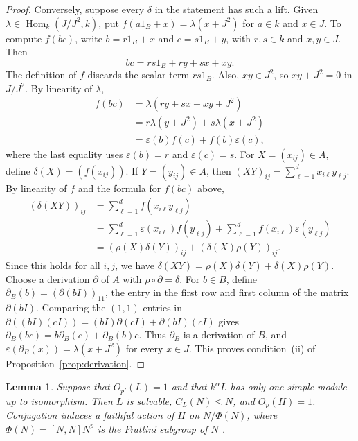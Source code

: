 \documentclass[11pt,a4paper]{article}
\newtheorem{lemma}[theorem]{Lemma}
\theoremstyle{definition}
\theoremstyle{remark}
\numberwithin{equation}{section}
\DeclareMathOperator{\Hom}{Hom}
\begin{document}
\begin{proof}
		Conversely, suppose every $\delta$ in the statement has such a lift.
		Given $\lambda\in\Hom_k(J/J^2,k)$, put $f(a1_B+x)=\lambda(x+J^2)$
		for $a\in k$ and $x\in J$. To compute $f(bc)$, write
		$b=r1_B+x$ and $c=s1_B+y$, with $r,s\in k$ and $x,y\in J$. Then
		\[
		bc=rs1_B+ry+sx+xy.
		\]
		The definition of $f$ discards the scalar term $rs1_B$. Also,
		$xy\in J^2$, so $xy+J^2=0$ in $J/J^2$. By linearity of $\lambda$,
		\[
		\begin{aligned}
			f(bc)&=\lambda(ry+sx+xy+J^2)\\
			&=r\lambda(y+J^2)+s\lambda(x+J^2)\\
			&=\varepsilon(b)f(c)+f(b)\varepsilon(c),
		\end{aligned}
		\]
		where the last equality uses $\varepsilon(b)=r$ and $\varepsilon(c)=s$.
		For $X=(x_{ij})\in A$, define $\delta(X)=(f(x_{ij}))$.
		If $Y=(y_{ij})\in A$, then $(XY)_{ij}=\sum_{\ell=1}^d x_{i\ell}y_{\ell j}$.
		By linearity of $f$ and the formula for $f(bc)$ above,
		\[
		\begin{aligned}
			(\delta(XY))_{ij}
			&=\sum_{\ell=1}^d f(x_{i\ell}y_{\ell j})\\
			&=\sum_{\ell=1}^d \varepsilon(x_{i\ell})f(y_{\ell j})
			+\sum_{\ell=1}^d f(x_{i\ell})\varepsilon(y_{\ell j})\\
			&=(\rho(X)\delta(Y))_{ij}+(\delta(X)\rho(Y))_{ij}.
		\end{aligned}
		\]
		Since this holds for all $i,j$, we have
		$\delta(XY)=\rho(X)\delta(Y)+\delta(X)\rho(Y)$. Choose a derivation $\partial$
		of $A$ with $\rho\circ\partial=\delta$. For $b\in B$, define
		$\partial_B(b)=(\partial(bI))_{11}$, the entry in the first row and first
		column of the matrix $\partial(bI)$. Comparing the $(1,1)$ entries in
		$\partial((bI)(cI))=(bI)\partial(cI)+\partial(bI)(cI)$ gives
		$\partial_B(bc)=b\partial_B(c)+\partial_B(b)c$. Thus $\partial_B$ is
		a derivation of $B$, and $\varepsilon(\partial_B(x))=\lambda(x+J^2)$
		for every $x\in J$. This proves condition~(ii) of Proposition~\ref{prop:derivation}.
	\end{proof}
	
	\begin{lemma}\label{lem:one-simple-reduction}
		Suppose that $O_{p'}(L)=1$ and that $k^\alpha L$ has only one simple
		module up to isomorphism. Then $L$ is solvable, $C_L(N)\leq N$, and
		$O_p(H)=1$. Conjugation induces a faithful action of $H$ on
		$N/\Phi(N)$, where $\Phi(N)=[N,N]N^p$ is the Frattini subgroup of $N$ \cite[Proposition~2.25]{Craven2008}.
	\end{lemma}
	
\end{document}
